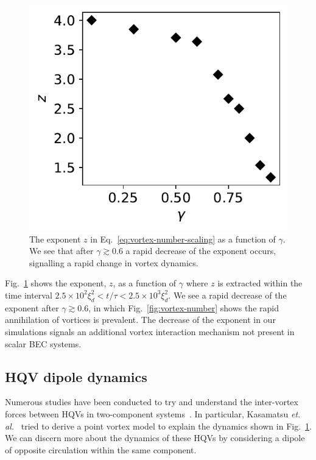 \begin{figure}[t!]
    \centering
    \includegraphics{gfx/ch-twoCompDynamics/gamma_vs_expo.pdf}
    \caption{The exponent $z$ in Eq.~\eqref{eq:vortex-number-scaling} as a
    function of $\gamma$.
    We see that after $\gamma \gtrsim 0.6$ a rapid decrease of the exponent
    occurs, signalling a rapid change in vortex dynamics.}
    \label{fig:exponent-vs-gamma}
\end{figure}
Fig.~\ref{fig:exponent-vs-gamma} shows the exponent, $z$, as a function of
$\gamma$ where $z$ is extracted within the time interval
$2.5 \times 10^2\xi_d^2 < t/\tau < 2.5\times10^3\xi_d^2$.
We see a rapid decrease of the exponent after $\gamma \gtrsim 0.6$, in which
Fig.~\ref{fig:vortex-number} shows the rapid annihilation of vortices is
prevalent.
The decrease of the exponent in our simulations signals an additional vortex
interaction mechanism not present in scalar BEC systems.

\subsection{HQV dipole dynamics}
Numerous studies have been conducted to try and understand the inter-vortex
forces between HQVs in two-component systems~\cite{Eto2011, Kasamatsu2016}.
In particular, Kasamatsu {\it et. al.}~\cite{Kasamatsu2016} tried to derive a
point vortex model to explain the dynamics shown in
Fig.~\ref{fig:exponent-vs-gamma}.
We can discern more about the dynamics of these HQVs by considering a dipole
of opposite circulation within the same component.
